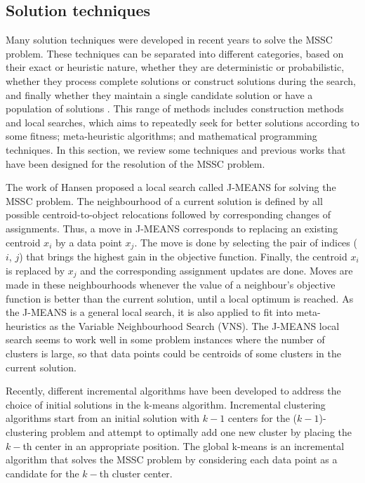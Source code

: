 \subsection{Solution techniques}
Many solution techniques were developed in recent years to solve the MSSC problem. These techniques can be separated into different categories, based on their exact or heuristic nature, whether they are deterministic or probabilistic, whether they process complete solutions or construct solutions during the search, and finally whether they maintain a single candidate solution or have a population of solutions \cite{Das2009}. This range of methods includes construction methods and local searches, which aims to repeatedly seek for better solutions according to some fitness; meta-heuristic algorithms; and mathematical programming techniques. In this section, we review some techniques and previous works that have been designed for the resolution of the MSSC problem.

The work of Hansen \cite{Hansen2001} proposed a local search called J-MEANS for solving the MSSC problem. The neighbourhood of a current solution is defined by all possible centroid-to-object relocations followed by corresponding changes of assignments. Thus, a move in J-MEANS corresponds to replacing an existing centroid $x_i$ by a data point $x_j$. The move is done by selecting the pair of indices ($i$, $j$) that brings the highest gain in the objective function. Finally, the centroid $x_i$ is replaced by $x_j$ and the corresponding assignment updates are done. Moves are made in these neighbourhoods whenever the value of a neighbour's objective function is better than the current solution, until a local optimum is reached. As the J-MEANS is a general local search, it is also applied to fit into meta-heuristics as the Variable Neighbourhood Search (VNS). The J-MEANS local search seems to work well in some problem instances where the number of clusters is large, so that data points could be centroids of some clusters in the current solution.

Recently, different incremental algorithms have been developed to address the choice of initial solutions in the k-means algorithm. Incremental clustering algorithms start from an initial solution with $k - 1$ centers for the ($k - 1$)-clustering problem and attempt to optimally add one new cluster by placing the $k-$th center in an appropriate position. The global k-means \cite{Likas2003} is an incremental algorithm that solves the MSSC problem by considering each data point as a candidate for the $k-$th cluster center.

